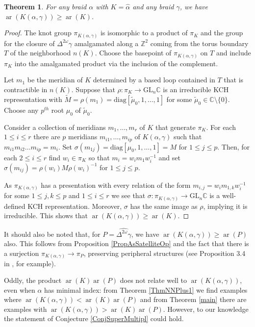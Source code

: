 \documentclass[11pt]{amsart}
\def\s{{\sigma}}
\def\ar{\operatorname{ar}}
\newtheorem{thm}{Theorem}[section]
\theoremstyle{definition}
\begin{document}
\begin{thm}For any braid $\alpha$ with $K=\hat{\alpha}$ and any braid $\gamma$, we have $\ar(K(\alpha,\gamma)) \ge \ar(K)$.
\label{ThmCompanionRank}
\end{thm}
\begin{proof}The knot group $\pi_{K(\alpha,\gamma)}$ is isomorphic to a product of $\pi_K$ and the group for the closure of $\Delta^{2\omega}\gamma$ amalgamated along a $\mathbb Z^2$ coming from the torus boundary $T$ of the neighborhood $n(K)$. Choose the basepoint of $\pi_{K(\alpha,\gamma)}$ on $T$ and include $\pi_K$ into the amalgamated product via the inclusion of the complement.

Let $m_1$ be the meridian of $K$ determined by a based loop contained in $T$ that is contractible in $n(K)$. Suppose that $\rho:\pi_K\to\text{GL}_n\mathbb C$ is an irreducible KCH representation with $\widetilde M = \rho(m_1) = \text{diag}[\widetilde\mu_0,1,\ldots,1]$ for some $\widetilde\mu_0\in\mathbb C\setminus\{0\}$. Choose any $p^{th}$ root $\mu_0$ of $\widetilde\mu_0$. 

Consider a collection of meridians $m_1,\ldots,m_r$ of $K$ that generate $\pi_K$. For each $1\le i\le r$ there are $p$ meridians $m_{i1},\ldots,m_{ip}$ of $K(\alpha,\gamma)$ such that $m_{i1}m_{i2}\ldots m_{ip} = m_i$. Set $\s(m_{1j}) = \text{diag}[\mu_0,1,\ldots,1] = M$ for $1\le j\le p$. Then, for each $2\le i\le r$ find $w_i\in\pi_K$ so that $m_i = w_im_1w_i^{-1}$ and set $\s(m_{ij}) = \rho(w_i)M\rho(w_i)^{-1}$ for $1\le j\le p$.

As $\pi_{K(\alpha,\gamma)}$ has a presentation with every relation of the form $m_{i,j} = w_im_{1,k}w_i^{-1}$ for some $1\le j, k\le p$ and $1\le i\le r$ we see that $\s:\pi_{K(\alpha,\gamma)}\to\text{GL}_n\mathbb C$ is a well-defined KCH representation. Moreover, $\s$ has the same image as $\rho$, implying it is irreducible. This shows that $\ar(K(\alpha,\gamma))\ge \ar(K)$.
\end{proof}

It should also be noted that, for $P=\widehat{\Delta^{2\omega}\gamma}$, we have $\ar(K(\alpha,\gamma))\ge \ar(P)$ also. This follows from Proposition \ref{PropAsSatelliteOp} and the fact that there is a surjection $\pi_{K(\alpha,\gamma)}\to\pi_P$, preserving peripheral structures (see Proposition 3.4 in \cite{SW}, for example). 

Oddly, the product $\ar(K)\ar(P)$ does not relate well to $\ar(K(\alpha,\gamma))$, even when $\alpha$ has minimal index: from Theorem \ref{ThmNNPlus1} we find examples where $\ar(K(\alpha,\gamma))<\ar(K)\ar(P)$ and from Theorem \ref{main} there are examples with $\ar(K(\alpha,\gamma))>\ar(K)\ar(P)$. However, to our knowledge the statement of Conjecture \ref{ConjSuperMultipl} could hold. 
\end{document}
